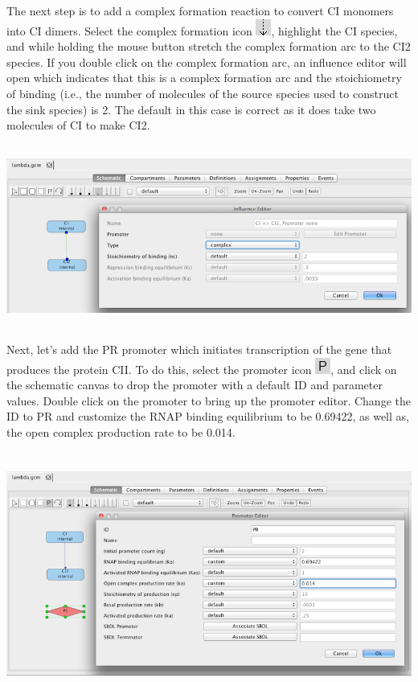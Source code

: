 \documentclass[titlepage,11pt]{article}
\begin{document}
The next step is to add a complex formation reaction to convert CI monomers into CI dimers.  Select the complex formation icon \includegraphics{../gui/icons/modelview/bio_activation_selected}, highlight the CI species, and while holding the mouse button stretch the complex formation arc to the CI2 species.   If you double click on the complex formation arc, an influence editor will open which indicates that this is a complex formation arc and the stoichiometry of binding (i.e., the number of molecules of the source species used to construct the sink species) is 2.  The default in this case is correct as it does take two molecules of CI to make CI2.

\begin{center}
\includegraphics[height=60mm]{screenshots/complex} 
\end{center}

Next, let's add the PR promoter which initiates transcription of the gene that produces the protein CII.  To do this, select the promoter icon \includegraphics{../gui/icons/modelview/promoter_mode_selected}, and click on the schematic canvas to drop the promoter with a default ID and parameter values.  Double click on the promoter to bring up the promoter editor.  Change the ID to PR and customize the RNAP binding equilibrium to be 0.69422, as well as, the open complex production rate to be 0.014. 

\begin{center}
\includegraphics[height=80mm]{screenshots/promoter} 
\end{center}
\end{document}
